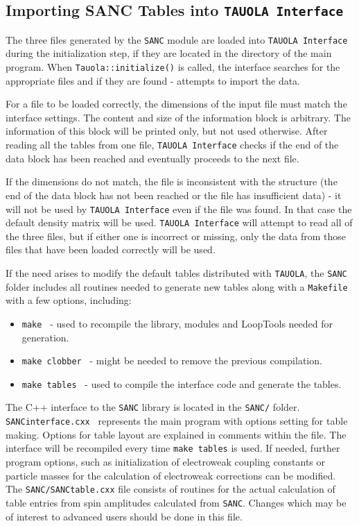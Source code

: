 \documentclass[]{Tauola_interface_design}
\begin{document}
\subsection{Importing SANC Tables into {\tt TAUOLA Interface}}
\label{sect:Importing}
The three files generated by the {\tt SANC} module are loaded into {\tt TAUOLA Interface}
during the initialization step, if they are located in the directory of the main  program. 
When {\tt Tauola::initialize()} is called, the interface searches for the appropriate
files and if they are found - attempts to import the data.

For a file to be loaded correctly, the dimensions of the input file must match the interface settings.
The content and size of the information block is arbitrary. The information of this block will be 
printed only, but not used otherwise.
After reading all the tables from one file, {\tt TAUOLA Interface} checks if the 
end of the data block has been reached and eventually proceeds to the next file.

If the dimensions do not match, the file is inconsistent with the structure 
(the end of the data block has not been reached or the file has insufficient data) 
- it will not be used by {\tt TAUOLA Interface} even if the file was found. 
In that case the default density matrix will be used.
{\tt TAUOLA Interface} will attempt to read all of the three files, but if either one is 
incorrect or missing,  only the data from those files that have been loaded
correctly will be used.

If the need arises to modify the default tables distributed with {\tt TAUOLA}, the {\tt SANC} folder includes all routines
needed to generate new tables along with a {\tt Makefile} with a few options, including:
\begin{itemize}
  \item {\tt make } - used to recompile the library, modules and LoopTools needed for generation.
  \item {\tt make clobber } - might be needed to remove the previous compilation.
  \item {\tt make tables } - used to compile the interface code and generate the tables.
\end{itemize}

The C++ interface to the {\tt SANC} library is located in the {\tt SANC/} folder.
{\tt SANCinterface.cxx } represents the main program with options setting for table making.
Options for table layout are  explained in comments within the file.
The interface will be recompiled every time {\tt make tables} is used.
 If needed, further
program options, such as initialization of electroweak coupling constants or particle 
masses for the
calculation of electroweak corrections can be modified. 
The {\tt SANC/SANCtable.cxx} file consists of routines for the actual calculation 
of table entries from  spin amplitudes  calculated from {\tt SANC}.
Changes which may be of interest to advanced users should be done in this file.
\end{document}
